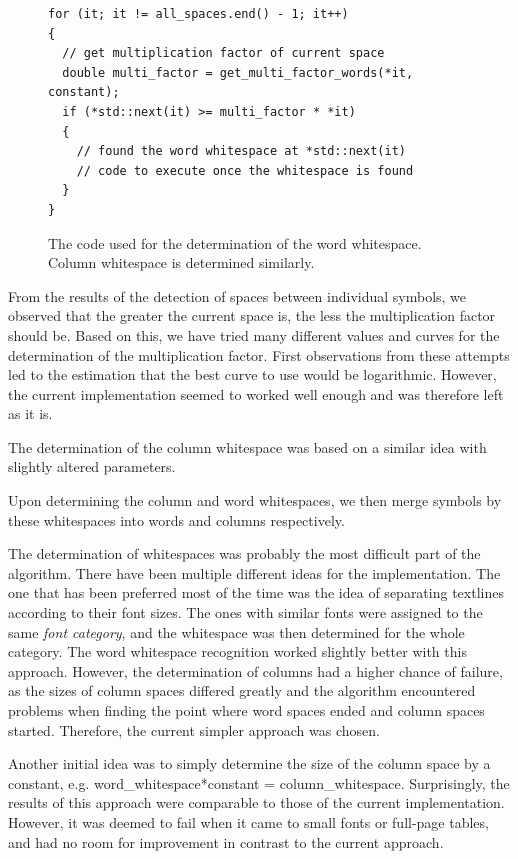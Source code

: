 \begin{figure}
{\small \begin{verbatim}
for (it; it != all_spaces.end() - 1; it++)
{
  // get multiplication factor of current space
  double multi_factor = get_multi_factor_words(*it, constant);
  if (*std::next(it) >= multi_factor * *it)
  {
    // found the word whitespace at *std::next(it)
    // code to execute once the whitespace is found
  }
}
\end{verbatim}}
\caption{The code used for the determination of the word whitespace. Column whitespace is determined similarly.}
\label{whitespaceDetermCode}
\end{figure}

From the results of the detection of spaces between individual symbols, we observed that the greater the current space is, the less the multiplication factor should be. Based on this, we have tried many different values and curves for the determination of the multiplication factor. First observations from these attempts led to the estimation that the best curve to use would be logarithmic. However, the current implementation seemed to worked well enough and was therefore left as it is.

The determination of the column whitespace was based on a similar idea with slightly altered parameters.

Upon determining the column and word whitespaces, we then merge symbols by these whitespaces into words and columns respectively.

The determination of whitespaces was probably the most difficult part of the algorithm. There have been multiple different ideas for the implementation. The one that has been preferred most of the time was the idea of separating textlines according to their font sizes. The ones with similar fonts were assigned to the same \emph{font category}, and the whitespace was then determined for the whole category. The word whitespace recognition worked slightly better with this approach. However, the determination of columns had a higher chance of failure, as the sizes of column spaces differed greatly and the algorithm encountered problems when finding the point where word spaces ended and column spaces started. Therefore, the current simpler approach was chosen.

Another initial idea was to simply determine the size of the column space by a constant, e.g. word\_whitespace*constant = column\_whitespace. Surprisingly, the results of this approach were comparable to those of the current implementation. However, it was deemed to fail when it came to small fonts or full-page tables, and had no room for improvement in contrast to the current approach.

